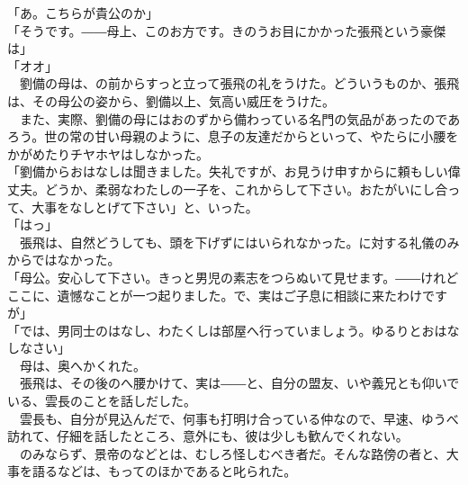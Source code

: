\documentclass[
  paper=a5,
  fontsize=10pt,
  jafontsize=9.5pt,
  tate,                  %
  open_bracket_pos=nibu, %
]{jlreq}
\begin{document}
「あ。こちらが貴公のか」\\


「そうです。――母上、このお方です。きのうお目にかかった張飛という豪傑は」\\


「オオ」\\


　劉備の母は、の前からすっと立って張飛の礼をうけた。どういうものか、張飛は、その母公の姿から、劉備以上、気高い威圧をうけた。\\


　また、実際、劉備の母にはおのずから備わっている名門の気品があったのであろう。世の常の甘い母親のように、息子の友達だからといって、やたらに小腰をかがめたりチヤホヤはしなかった。\\


「劉備からおはなしは聞きました。失礼ですが、お見うけ申すからに頼もしい偉丈夫。どうか、柔弱なわたしの一子を、これからして下さい。おたがいにし合って、大事をなしとげて下さい」と、いった。\\


「はっ」\\


　張飛は、自然どうしても、頭を下げずにはいられなかった。に対する礼儀のみからではなかった。\\


「母公。安心して下さい。きっと男児の素志をつらぬいて見せます。――けれどここに、遺憾なことが一つ起りました。で、実はご子息に相談に来たわけですが」\\


「では、男同士のはなし、わたくしは部屋へ行っていましょう。ゆるりとおはなしなさい」\\


　母は、奥へかくれた。\\


　張飛は、その後のへ腰かけて、実は――と、自分の盟友、いや義兄とも仰いでいる、雲長のことを話しだした。\\


　雲長も、自分が見込んだで、何事も打明け合っている仲なので、早速、ゆうべ訪れて、仔細を話したところ、意外にも、彼は少しも歓んでくれない。\\


　のみならず、景帝のなどとは、むしろ怪しむべき者だ。そんな路傍の者と、大事を語るなどは、もってのほかであると叱られた。\\
\end{document}
